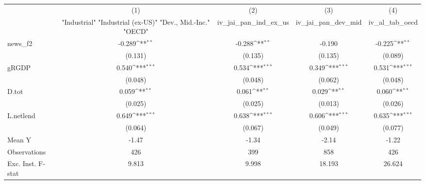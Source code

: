 {
\def\sym#1{\ifmmode^{#1}\else\(^{#1}\)\fi}
\begin{tabular}{l*{4}{c}}
\toprule
            &\multicolumn{1}{c}{(1)}&\multicolumn{1}{c}{(2)}&\multicolumn{1}{c}{(3)}&\multicolumn{1}{c}{(4)}\\
            &\multicolumn{1}{c}{ "Industrial" "Industrial (ex-US)" "Dev., Mid.-Inc." "OECD" }&\multicolumn{1}{c}{iv\_jai\_pan\_ind\_ex\_us}&\multicolumn{1}{c}{iv\_jai\_pan\_dev\_mid}&\multicolumn{1}{c}{iv\_al\_tab\_oecd}\\
\midrule
news\_f2     &      -0.289\sym{**} &      -0.288\sym{**} &      -0.190         &      -0.225\sym{**} \\
            &     (0.131)         &     (0.135)         &     (0.135)         &     (0.089)         \\
\addlinespace
gRGDP       &       0.540\sym{***}&       0.534\sym{***}&       0.349\sym{***}&       0.531\sym{***}\\
            &     (0.048)         &     (0.048)         &     (0.062)         &     (0.048)         \\
\addlinespace
D.tot       &       0.059\sym{**} &       0.061\sym{**} &       0.029\sym{**} &       0.060\sym{**} \\
            &     (0.025)         &     (0.025)         &     (0.013)         &     (0.026)         \\
\addlinespace
L.netlend   &       0.649\sym{***}&       0.638\sym{***}&       0.606\sym{***}&       0.635\sym{***}\\
            &     (0.064)         &     (0.067)         &     (0.049)         &     (0.077)         \\
\midrule
Mean Y      &       -1.47         &       -1.34         &       -2.14         &       -1.22         \\
Observations&         426         &         399         &         858         &         426         \\
Exc. Inst. F-stat&       9.813         &       9.998         &      18.193         &      26.624         \\
\bottomrule
\end{tabular}
}
